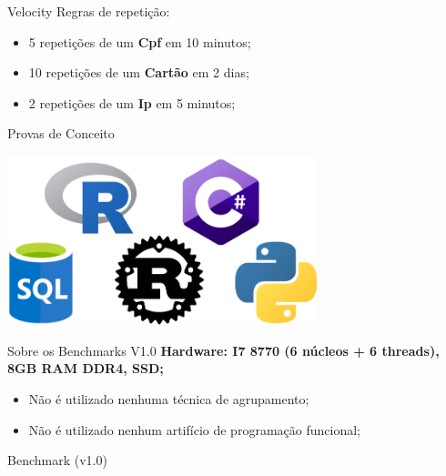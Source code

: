 \documentclass[aspectratio=169]{beamer}
\begin{document}
\begin{frame}{Velocity}
Regras de repetição:
\begin{itemize}
	\item 5 repetições de um \textbf{Cpf} em 10 minutos;
	\item 10 repetições de um \textbf{Cartão} em 2 dias;
	\item 2 repetições de um \textbf{Ip} em 5 minutos;
\end{itemize}

\begin{chronology}[5]{1}{10}{80ex}[\textwidth]
\end{chronology}
\end{frame}

\begin{frame}{Provas de Conceito}
	\begin{center}
		\includegraphics[width=9.0cm]{imgs/battle.png}	
	\end{center}
\end{frame}

\begin{frame}{Sobre os Benchmarks V1.0}	
	\textbf{Hardware: I7 8770 (6 núcleos + 6 threads), 8GB RAM DDR4, SSD;}
	
	\begin{itemize}
		\item Não é utilizado nenhuma técnica de agrupamento;
		\item Não é utilizado nenhum artifício de programação funcional;
	\end{itemize}
\end{frame}

\begin{frame}{Benchmark (v1.0)}
	\begin{figure}
	\end{figure}
\end{frame}
\end{document}
